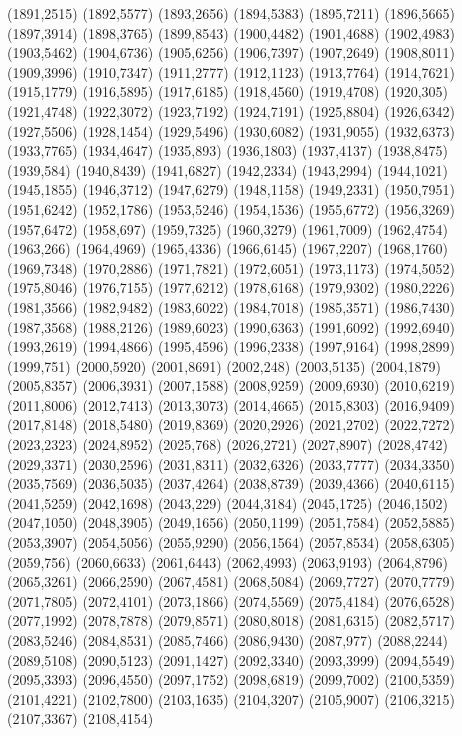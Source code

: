(1891,2515)
(1892,5577)
(1893,2656)
(1894,5383)
(1895,7211)
(1896,5665)
(1897,3914)
(1898,3765)
(1899,8543)
(1900,4482)
(1901,4688)
(1902,4983)
(1903,5462)
(1904,6736)
(1905,6256)
(1906,7397)
(1907,2649)
(1908,8011)
(1909,3996)
(1910,7347)
(1911,2777)
(1912,1123)
(1913,7764)
(1914,7621)
(1915,1779)
(1916,5895)
(1917,6185)
(1918,4560)
(1919,4708)
(1920,305)
(1921,4748)
(1922,3072)
(1923,7192)
(1924,7191)
(1925,8804)
(1926,6342)
(1927,5506)
(1928,1454)
(1929,5496)
(1930,6082)
(1931,9055)
(1932,6373)
(1933,7765)
(1934,4647)
(1935,893)
(1936,1803)
(1937,4137)
(1938,8475)
(1939,584)
(1940,8439)
(1941,6827)
(1942,2334)
(1943,2994)
(1944,1021)
(1945,1855)
(1946,3712)
(1947,6279)
(1948,1158)
(1949,2331)
(1950,7951)
(1951,6242)
(1952,1786)
(1953,5246)
(1954,1536)
(1955,6772)
(1956,3269)
(1957,6472)
(1958,697)
(1959,7325)
(1960,3279)
(1961,7009)
(1962,4754)
(1963,266)
(1964,4969)
(1965,4336)
(1966,6145)
(1967,2207)
(1968,1760)
(1969,7348)
(1970,2886)
(1971,7821)
(1972,6051)
(1973,1173)
(1974,5052)
(1975,8046)
(1976,7155)
(1977,6212)
(1978,6168)
(1979,9302)
(1980,2226)
(1981,3566)
(1982,9482)
(1983,6022)
(1984,7018)
(1985,3571)
(1986,7430)
(1987,3568)
(1988,2126)
(1989,6023)
(1990,6363)
(1991,6092)
(1992,6940)
(1993,2619)
(1994,4866)
(1995,4596)
(1996,2338)
(1997,9164)
(1998,2899)
(1999,751)
(2000,5920)
(2001,8691)
(2002,248)
(2003,5135)
(2004,1879)
(2005,8357)
(2006,3931)
(2007,1588)
(2008,9259)
(2009,6930)
(2010,6219)
(2011,8006)
(2012,7413)
(2013,3073)
(2014,4665)
(2015,8303)
(2016,9409)
(2017,8148)
(2018,5480)
(2019,8369)
(2020,2926)
(2021,2702)
(2022,7272)
(2023,2323)
(2024,8952)
(2025,768)
(2026,2721)
(2027,8907)
(2028,4742)
(2029,3371)
(2030,2596)
(2031,8311)
(2032,6326)
(2033,7777)
(2034,3350)
(2035,7569)
(2036,5035)
(2037,4264)
(2038,8739)
(2039,4366)
(2040,6115)
(2041,5259)
(2042,1698)
(2043,229)
(2044,3184)
(2045,1725)
(2046,1502)
(2047,1050)
(2048,3905)
(2049,1656)
(2050,1199)
(2051,7584)
(2052,5885)
(2053,3907)
(2054,5056)
(2055,9290)
(2056,1564)
(2057,8534)
(2058,6305)
(2059,756)
(2060,6633)
(2061,6443)
(2062,4993)
(2063,9193)
(2064,8796)
(2065,3261)
(2066,2590)
(2067,4581)
(2068,5084)
(2069,7727)
(2070,7779)
(2071,7805)
(2072,4101)
(2073,1866)
(2074,5569)
(2075,4184)
(2076,6528)
(2077,1992)
(2078,7878)
(2079,8571)
(2080,8018)
(2081,6315)
(2082,5717)
(2083,5246)
(2084,8531)
(2085,7466)
(2086,9430)
(2087,977)
(2088,2244)
(2089,5108)
(2090,5123)
(2091,1427)
(2092,3340)
(2093,3999)
(2094,5549)
(2095,3393)
(2096,4550)
(2097,1752)
(2098,6819)
(2099,7002)
(2100,5359)
(2101,4221)
(2102,7800)
(2103,1635)
(2104,3207)
(2105,9007)
(2106,3215)
(2107,3367)
(2108,4154)
